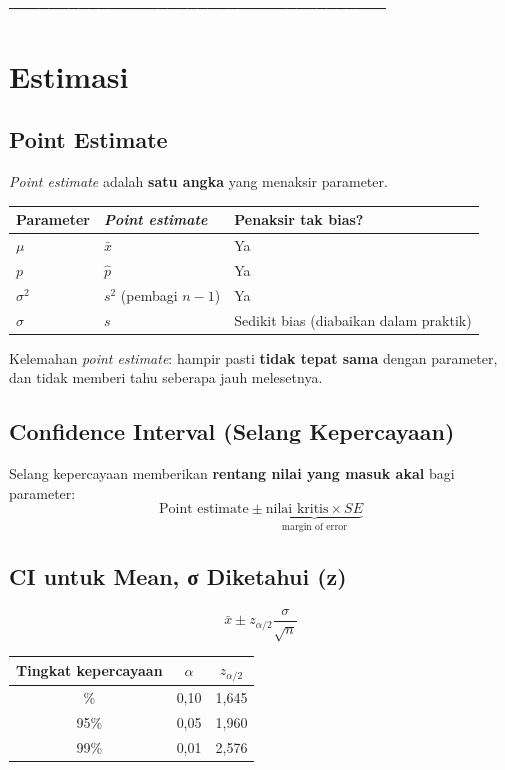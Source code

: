 \documentclass[
  indonesian,
  letterpaper,
]{book}
\newcounter{none} %
\begin{document}
──────────────────────────────────────

\section{Estimasi}\label{estimasi}

\subsection{Point Estimate}\label{point-estimate}

\emph{Point estimate} adalah \textbf{satu angka} yang menaksir
parameter.

{\def\LTcaptype{none} %
\begin{longtable}[]{@{}lll@{}}
\toprule\noalign{}
Parameter & \emph{Point estimate} & Penaksir tak bias? \\
\midrule\noalign{}
\endhead
\bottomrule\noalign{}
\endlastfoot
\(\mu\) & \(\bar{x}\) & Ya \\
\(p\) & \(\hat{p}\) & Ya \\
\(\sigma^2\) & \(s^2\) (pembagi \(n-1\)) & Ya \\
\(\sigma\) & \(s\) & Sedikit bias (diabaikan dalam praktik) \\
\end{longtable}
}

Kelemahan \emph{point estimate}: hampir pasti \textbf{tidak tepat sama}
dengan parameter, dan tidak memberi tahu seberapa jauh melesetnya.

\subsection{Confidence Interval (Selang
Kepercayaan)}\label{confidence-interval-selang-kepercayaan}

Selang kepercayaan memberikan \textbf{rentang nilai yang masuk akal}
bagi parameter:
\[\text{Point estimate} \pm \underbrace{\text{nilai kritis} \times SE}_{\text{margin of error}}\]

\subsection{CI untuk Mean, σ Diketahui
(z)}\label{ci-untuk-mean-ux3c3-diketahui-z}

\[\displaystyle \bar{x} \pm z_{\alpha/2} \frac{\sigma}{\sqrt{n}}\]

{\def\LTcaptype{none} %
\begin{longtable}[]{@{}ccc@{}}
\toprule\noalign{}
Tingkat kepercayaan & \(\alpha\) & \(z_{\alpha/2}\) \\
\midrule\noalign{}
\endhead
\bottomrule\noalign{}
\endlastfoot
90\% & 0,10 & 1,645 \\
95\% & 0,05 & 1,960 \\
99\% & 0,01 & 2,576 \\
\end{longtable}
}
\end{document}
